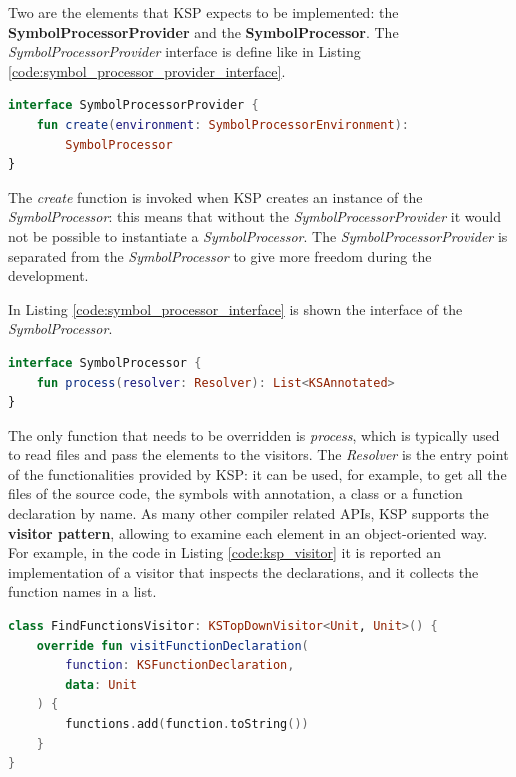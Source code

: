 Two are the elements that KSP expects to be implemented: the \textbf{SymbolProcessorProvider} and the \textbf{SymbolProcessor}.\newline
The \textit{SymbolProcessorProvider} interface is define like in Listing \ref{code:symbol_processor_provider_interface}.
\begin{lstlisting}[caption={SymbolProcessorProvider interface \cite{ksp_documentation}}, language=Kotlin, captionpos=b, label={code:symbol_processor_provider_interface}]
interface SymbolProcessorProvider {
    fun create(environment: SymbolProcessorEnvironment):
        SymbolProcessor
}
\end{lstlisting}
The \textit{create} function is invoked when KSP creates an instance of the \textit{SymbolProcessor}: this means that without the \textit{SymbolProcessorProvider} it would not be possible to instantiate a \textit{SymbolProcessor}. The \textit{SymbolProcessorProvider} is separated from the \textit{SymbolProcessor} to give more freedom during the development.

In Listing \ref{code:symbol_processor_interface} is shown the interface of the \textit{SymbolProcessor}.
\begin{lstlisting}[caption={SymbolProcessor interface \cite{ksp_documentation}}, language=Kotlin, captionpos=b, label={code:symbol_processor_interface}]
interface SymbolProcessor {
    fun process(resolver: Resolver): List<KSAnnotated>
}
\end{lstlisting}
The only function that needs to be overridden is \textit{process}, which is typically used to read files and pass the elements to the visitors.\newline
The \textit{Resolver} is the entry point of the functionalities provided by KSP: it can be used, for example, to get all the files of the source code, the symbols with annotation, a class or a function declaration by name.\newline
As many other compiler related APIs, KSP supports the \textbf{visitor pattern}, allowing to examine each element in an object-oriented way.\newline
For example, in the code in Listing \ref{code:ksp_visitor} it is reported an implementation of a visitor that inspects the declarations, and it collects the function names in a list.
\begin{lstlisting}[caption={Visitor that collects function declarations \cite{ksp_documentation}}, language=Kotlin, captionpos=b, label={code:ksp_visitor}]
class FindFunctionsVisitor: KSTopDownVisitor<Unit, Unit>() {
    override fun visitFunctionDeclaration(
        function: KSFunctionDeclaration,
        data: Unit
    ) {
        functions.add(function.toString())
    }
}
\end{lstlisting}


